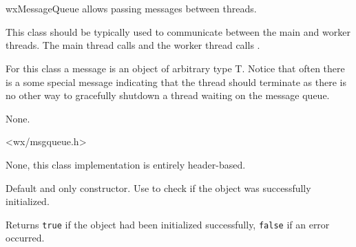 
\section{}\label{wxmessagequeue}

wxMessageQueue allows passing messages between threads.

This class should be typically used to communicate between the main and worker
threads. The main thread calls  and
the worker thread calls .

For this class a message is an object of arbitrary type T. Notice that
often there is a some special message indicating that the thread
should terminate as there is no other way to gracefully shutdown a thread
waiting on the message queue.


None.


<wx/msgqueue.h>


None, this class implementation is entirely header-based.






\label{wxmessagequeuector}


Default and only constructor. Use  to check
if the object was successfully initialized.


\label{wxmessagequeueisok}


Returns {\tt true} if the object had been initialized successfully, {\tt false} 
if an error occurred.


